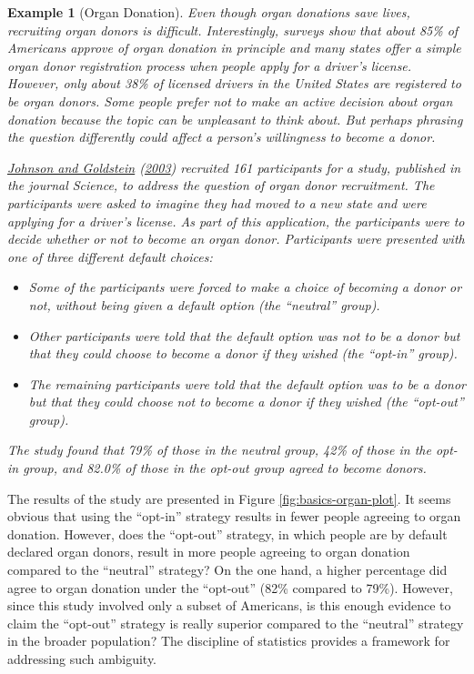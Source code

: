 \documentclass[
]{book}
\providecommand{\tightlist}{%
  \setlength{\itemsep}{0pt}\setlength{\parskip}{0pt}}
\theoremstyle{plain}
\theoremstyle{mydefn}
\theoremstyle{myexmpl}
\newtheorem{example}{Example}[chapter]
\theoremstyle{remark}
\begin{document}
\begin{example}[Organ Donation]
\protect\hypertarget{exm:basics-organ-donation}{}{\label{exm:basics-organ-donation} {} }Even though organ donations save lives, recruiting organ donors is difficult. Interestingly, surveys show that about 85\% of Americans approve of organ donation in principle and many states offer a simple organ donor registration process when people apply for a driver's license. However, only about 38\% of licensed drivers in the United States are registered to be organ donors. Some people prefer not to make an active decision about organ donation because the topic can be unpleasant to think about. But perhaps phrasing the question differently could affect a person's willingness to become a donor.

\protect\hyperlink{ref-Johnson2003}{Johnson and Goldstein} (\protect\hyperlink{ref-Johnson2003}{2003}) recruited 161 participants for a study, published in the journal \emph{Science}, to address the question of organ donor recruitment. The participants were asked to imagine they had moved to a new state and were applying for a driver's license. As part of this application, the participants were to decide whether or not to become an organ donor. Participants were presented with one of three different default choices:

\begin{itemize}
\tightlist
\item
  Some of the participants were forced to make a choice of becoming a donor or not, without being given a default option (the ``neutral'' group).
\item
  Other participants were told that the default option was not to be a donor but that they could choose to become a donor if they wished (the ``opt-in'' group).
\item
  The remaining participants were told that the default option was to be a donor but that they could choose not to become a donor if they wished (the ``opt-out'' group).
\end{itemize}

The study found that 79\% of those in the neutral group, 42\% of those in the opt-in group, and 82.0\% of those in the opt-out group agreed to become donors.
\end{example}

The results of the study are presented in Figure \ref{fig:basics-organ-plot}. It seems obvious that using the ``opt-in'' strategy results in fewer people agreeing to organ donation. However, does the ``opt-out'' strategy, in which people are by default declared organ donors, result in more people agreeing to organ donation compared to the ``neutral'' strategy? On the one hand, a higher percentage did agree to organ donation under the ``opt-out'' (82\% compared to 79\%). However, since this study involved only a subset of Americans, is this enough evidence to claim the ``opt-out'' strategy is really superior compared to the ``neutral'' strategy in the broader population? The discipline of statistics provides a framework for addressing such ambiguity.
\end{document}
